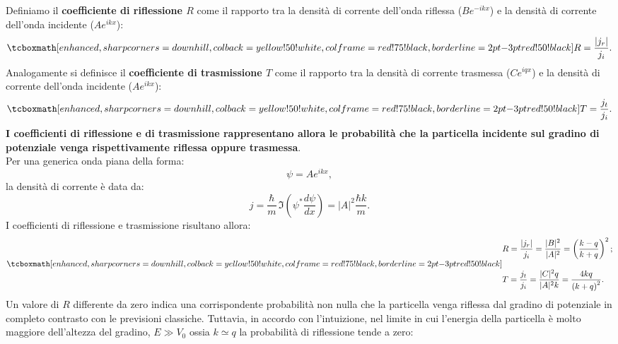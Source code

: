 Definiamo il \textbf{coefficiente di riflessione $R$} come il rapporto tra la densità di corrente dell'onda riflessa ($\displaystyle{Be^{-ikx}}$) e la densità di corrente dell'onda incidente ($\displaystyle{Ae^{ikx}}$):
	\begin{equation}
		\tcboxmath[enhanced, sharp corners=downhill, colback=yellow!50!white, colframe=red!75!black, borderline={2pt}{-3pt}{red!50!black}]{
			R=\frac{|j_r|}{j_i}.
			}
	\end{equation}
Analogamente si definisce il \textbf{coefficiente di trasmissione $T$} come il rapporto tra la densità di corrente trasmessa ($\displaystyle{Ce^{iqx}}$) e la densità di corrente dell'onda incidente ($\displaystyle{Ae^{ikx}}$):
	\begin{equation}
		\tcboxmath[enhanced, sharp corners=downhill, colback=yellow!50!white, colframe=red!75!black, borderline={2pt}{-3pt}{red!50!black}]{
			T=\frac{j_t}{j_i}.
			}
	\end{equation}
\textbf{I coefficienti di riflessione e di trasmissione rappresentano allora le probabilità che la particella incidente sul gradino di potenziale venga rispettivamente riflessa oppure trasmessa}.\\
Per una generica onda piana della forma:
	\begin{equation}
		\psi= Ae^{ikx},
	\end{equation}
la densità di corrente è data da:
	\begin{equation}
		j=\frac{\hbar}{m}\, \Im \left(\psi ^* \frac{d\psi}{dx} \right)= |A|^2\frac{\hbar k}{m}.
	\end{equation}
I coefficienti di riflessione e trasmissione risultano allora:
	\begin{equation}
		\tcboxmath[enhanced, sharp corners=downhill, colback=yellow!50!white, colframe=red!75!black, borderline={2pt}{-3pt}{red!50!black}]{
			\begin{aligned}
			& R=\frac{|j_r|}{j_i}= \frac{|B|^2}{|A|^2}=\left(\frac{k-q}{k+q}\right)^2; \\[0.3cm]
			& T=\frac{j_t}{j_i}= \frac{|C|^2 q}{|A|^2 k}=\frac{4kq}{\left(k+q\right)^2}. 
			\end{aligned}
			}
	\end{equation}
Un valore di $R$ differente da zero indica una corrispondente probabilità non nulla che la particella venga riflessa dal gradino di potenziale in completo contrasto con le previsioni classiche. Tuttavia, in accordo con l'intuizione, nel limite in cui l'energia della particella è molto maggiore dell'altezza del gradino, $E\gg V_0$ ossia $k\simeq q$ la probabilità di riflessione tende a zero:
